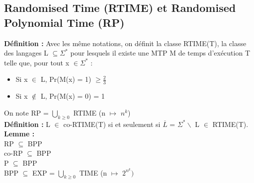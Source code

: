 \documentclass[12pt,a4paper]{article}
\newcommand\tab[1][0.65cm]{\hspace*{#1}}
\begin{document}
\subsection{Randomised Time (RTIME) et Randomised Polynomial Time (RP)}
\textbf{Définition :} Avec les même notations, on définit la classe RTIME(T), la classe des langages L $\subseteq \Sigma^*$ pour lesquels il existe une MTP M de temps d'exécution T telle que, pour tout x $\in \Sigma^*$ :
\begin{itemize}
	\item Si x $\in$ L, Pr(M(x) = 1) $\geq \frac{2}{3}$
	\item Si x $\not\in$ L, Pr(M(x) = 0) = 1
\end{itemize}
On note RP = $\bigcup\limits_{k \geq 0}$ RTIME (n $\longmapsto$ $n^k$)\\
\textbf{Définition :} L $\in$ co-RTIME(T) si et seulement si $\overline{L}$ = $\Sigma^* \backslash$ L $\in$ RTIME(T).\\
\textbf{Lemme :}\\
\tab RP $\subseteq$ BPP\\
\tab co-RP $\subseteq$ BPP\\
\tab P $\subseteq$ BPP\\
\tab BPP $\subseteq$ EXP = $\bigcup\limits_{k \geq 0}$ TIME (n $\longmapsto$ $2^{n^k})$
\end{document}
